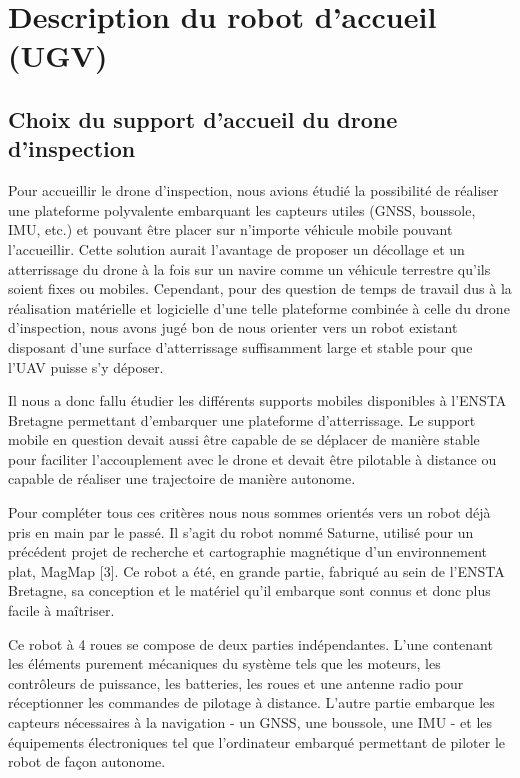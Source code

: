 \section{Description du robot d’accueil (UGV)}

\subsection{Choix du support d’accueil du drone d’inspection}

Pour accueillir le drone d’inspection, nous avions étudié la possibilité de réaliser une plateforme polyvalente embarquant les capteurs utiles (GNSS, boussole, IMU, etc.) et pouvant être placer sur n’importe véhicule mobile pouvant l’accueillir. Cette solution aurait l’avantage de proposer un décollage et un atterrissage du drone à la fois sur un navire comme un véhicule terrestre qu’ils soient fixes ou mobiles.
Cependant, pour des question de temps de travail dus à la réalisation matérielle et logicielle d’une telle plateforme combinée à celle du drone d’inspection, nous avons jugé bon de nous orienter vers un robot existant disposant d’une surface d'atterrissage suffisamment large et stable pour que l’UAV puisse s’y déposer.

Il nous a donc fallu étudier les différents supports mobiles disponibles à l’ENSTA Bretagne permettant d’embarquer une plateforme d'atterrissage. Le support mobile en question devait aussi être capable de se déplacer de manière stable pour faciliter l’accouplement avec le drone et devait être pilotable à distance ou capable de réaliser une trajectoire de manière autonome.

Pour compléter tous ces critères nous nous sommes orientés vers un robot déjà pris en main par le passé. Il s’agit du robot nommé Saturne, utilisé pour un précédent projet de recherche et cartographie magnétique d’un environnement plat, MagMap [3]. Ce robot a été, en grande partie, fabriqué au sein de l’ENSTA Bretagne, sa conception et le matériel qu’il embarque sont connus et donc plus facile à maîtriser.

Ce robot à 4 roues se compose de deux parties indépendantes.
L’une contenant les éléments purement mécaniques du système tels que les moteurs, les contrôleurs de puissance, les batteries, les roues et une antenne radio pour réceptionner les commandes de pilotage à distance.
L’autre partie embarque les capteurs nécessaires à la navigation - un GNSS, une boussole, une IMU - et les équipements électroniques tel que l’ordinateur embarqué permettant de piloter le robot de façon autonome.

